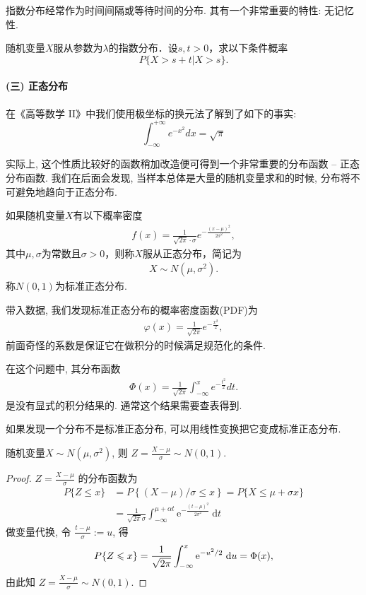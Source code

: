 指数分布经常作为时间间隔或等待时间的分布. 其有一个非常重要的特性: 无记忆性.

\begin{proposition}[指数分布的无记忆性]
    随机变量$X$服从参数为$\lambda$的指数分布．设$s,t>0$，求以下条件概率
    \[ P\{X>s+t|X>s\}.\]
\end{proposition}

\paragraph{(三) 正态分布}

在《高等数学 II》中我们使用极坐标的换元法了解到了如下的事实:
$$
    \int_{-\infty}^{+\infty}e^{-x^2} dx =\sqrt \pi
$$

实际上, 这个性质比较好的函数稍加改造便可得到一个非常重要的分布函数 --
正态分布函数. 我们在后面会发现, 当样本总体是大量的随机变量求和的时候,
分布将不可避免地趋向于正态分布.

\begin{definition}
    如果随机变量$X$有以下概率密度
    \begin{align*}
        f(x)=\frac1{\sqrt{2\pi}\cdot\sigma}e^{-\frac{(x-\mu)^2}{2\sigma^2}},
    \end{align*}
    其中$\mu,\sigma$为常数且$\sigma>0$，则称$X$服从正态分布，简记为%
    \begin{align*}
        X \sim N(\mu,\sigma^2).
    \end{align*}
    称$N(0,1)$为标准正态分布.
\end{definition}

带入数据, 我们发现标准正态分布的概率密度函数(PDF)为
\begin{align*}
\varphi(x)=\frac1{\sqrt{2\pi}}e^{-\frac{x^2}{2}},
\end{align*}
前面奇怪的系数是保证它在做积分的时候满足规范化的条件. 

在这个问题中, 其分布函数
  \begin{align*}
  \Phi(x)=\frac1{\sqrt{2\pi}}\int_{-\infty}^xe^{-\frac{t^2}{2}}dt.
  \end{align*}
是没有显式的积分结果的. 通常这个结果需要查表得到. 

如果发现一个分布不是标准正态分布, 可以用线性变换把它变成标准正态分布. 

\begin{proposition}
  随机变量$X\sim N(\mu,\sigma^2)$, 则 $Z=\frac{X-\mu}{\sigma}\sim N(0,1)$.
  \end{proposition}

  \begin{proof}
    { $Z=\frac{X-\mu}{\sigma}$ 的分布函数为$$
 \begin{aligned}
 P\{Z \leqslant x\} & =P\left\{{(X-\mu)}/{\sigma} \leqslant x\right\}=P\{X \leqslant \mu+\sigma x\} \\
 & =\frac{1}{\sqrt{2 \pi} \sigma} \int_{-\infty}^{\mu+\alpha t} \mathrm{e}^{-\frac{(t-\mu)^2}{2 \sigma^2}} \mathrm{~d} t
\end{aligned}
$$
做变量代换, 令 $\frac{t-\mu}{\sigma}:=u$, 得$$
\small P\{Z \leqslant x\}=\frac{1}{\sqrt{2 \pi}} \int_{-\infty}^x \mathrm{e}^{-u^2 / 2} \mathrm{~d} u=\Phi(x),
$$
由此知 $Z=\frac{X-\mu}{\sigma} \sim N(0,1)$.}
\end{proof}

